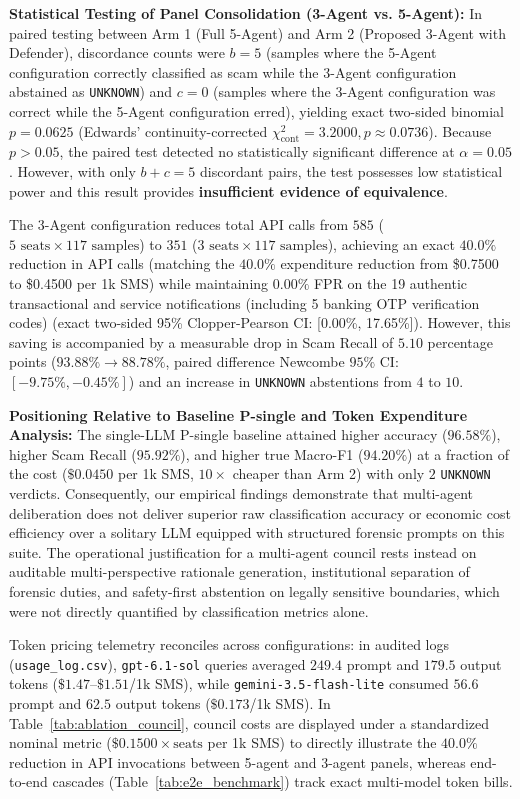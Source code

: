 \documentclass[journal]{IEEEtran}
\begin{document}
\textbf{Statistical Testing of Panel Consolidation (3-Agent vs. 5-Agent):}
In paired testing between Arm 1 (Full 5-Agent) and Arm 2 (Proposed 3-Agent with Defender), discordance counts were $b = 5$ (samples where the 5-Agent configuration correctly classified as scam while the 3-Agent configuration abstained as \texttt{UNKNOWN}) and $c = 0$ (samples where the 3-Agent configuration was correct while the 5-Agent configuration erred), yielding exact two-sided binomial $p = 0.0625$ (Edwards' continuity-corrected $\chi^2_{\text{cont}} = 3.2000, p \approx 0.0736$). Because $p > 0.05$, the paired test detected no statistically significant difference at $\alpha = 0.05$. However, with only $b + c = 5$ discordant pairs, the test possesses low statistical power and this result provides \textbf{insufficient evidence of equivalence}. 

The 3-Agent configuration reduces total API calls from $585$ ($5\text{ seats} \times 117\text{ samples}$) to $351$ ($3\text{ seats} \times 117\text{ samples}$), achieving an exact $40.0\%$ reduction in API calls (matching the $40.0\%$ expenditure reduction from \$0.7500 to \$0.4500 per 1k SMS) while maintaining $0.00\%$ FPR on the 19 authentic transactional and service notifications (including 5 banking OTP verification codes) (exact two-sided 95\% Clopper-Pearson CI: [0.00\%, 17.65\%]). However, this saving is accompanied by a measurable drop in Scam Recall of $5.10$ percentage points ($93.88\% \to 88.78\%$, paired difference Newcombe $95\%$ CI: $[-9.75\%, -0.45\%]$) and an increase in \texttt{UNKNOWN} abstentions from $4$ to $10$.

\textbf{Positioning Relative to Baseline P-single and Token Expenditure Analysis:}
The single-LLM P-single baseline attained higher accuracy ($96.58\%$), higher Scam Recall ($95.92\%$), and higher true Macro-F1 ($94.20\%$) at a fraction of the cost ($\$0.0450$ per 1k SMS, $10\times$ cheaper than Arm 2) with only $2$ \texttt{UNKNOWN} verdicts. Consequently, our empirical findings demonstrate that multi-agent deliberation does not deliver superior raw classification accuracy or economic cost efficiency over a solitary LLM equipped with structured forensic prompts on this suite. The operational justification for a multi-agent council rests instead on auditable multi-perspective rationale generation, institutional separation of forensic duties, and safety-first abstention on legally sensitive boundaries, which were not directly quantified by classification metrics alone.

Token pricing telemetry reconciles across configurations: in audited logs (\texttt{usage\_log.csv}), \texttt{gpt-6.1-sol} queries averaged $249.4$ prompt and $179.5$ output tokens ($\$1.47\text{--}\$1.51$/1k SMS), while \texttt{gemini-3.5-flash-lite} consumed $56.6$ prompt and $62.5$ output tokens ($\$0.173$/1k SMS). In Table~\ref{tab:ablation_council}, council costs are displayed under a standardized nominal metric ($\$0.1500 \times \text{seats}$ per 1k SMS) to directly illustrate the $40.0\%$ reduction in API invocations between 5-agent and 3-agent panels, whereas end-to-end cascades (Table~\ref{tab:e2e_benchmark}) track exact multi-model token bills.
\end{document}
